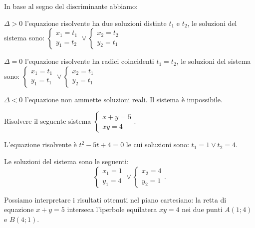 In base al segno del discriminante abbiamo:
\begin{itemize*}
\item \(\Delta >0\) l'equazione risolvente ha due soluzioni distinte \( t_1 \) e 
\( t_2 \), le soluzioni del sistema sono: 
\(\left\{\begin{array}{l}{x_1=t_1}\\{y_1=t_2}\end{array}\right.\vee 
\left\{\begin{array}{l}{x_2=t_2}\\{y_2=t_1}\end{array}\right.\)
\item \(\Delta =0\) l'equazione risolvente ha radici coincidenti \(t_1=t_2\), le 
soluzioni del sistema sono: 
\(\left\{\begin{array}{l}{x_1=t_1}\\{y_1=t_1}\end{array}\right.\vee 
\left\{\begin{array}{l}{x_2=t_1}\\{y_2=t_1}\end{array}\right.\)
\item \(\Delta <0\) l'equazione non ammette soluzioni reali. Il sistema è 
impossibile.
\end{itemize*}

\begin{esempio}{}{}
Risolvere il seguente sistema 
\(\left\{\begin{array}{l}{x+y=5}\\{xy=4}\end{array}\right.\).
\begin{htmulticols}{2}
L'equazione risolvente è \(t^2-5t+4=0\) le cui soluzioni sono: \(t_1=1\vee 
t_2=4\).

Le soluzioni del sistema sono le seguenti: \[ 
\left\{\begin{array}{l}{x_1=1}\\{y_1=4}\end{array}\right.\vee 
\left\{\begin{array}{l}{x_2=4}\\{y_2=1}\end{array}\right.. \]

Possiamo interpretare i risultati ottenuti nel piano cartesiano: la retta di 
equazione \(x+y=5\) interseca l'iperbole equilatera \({xy}=4\) nei due punti 
\(A(1;4)\) e \(B(4;1)\).
\begin{center}

\end{center}
\end{htmulticols}
\end{esempio}

